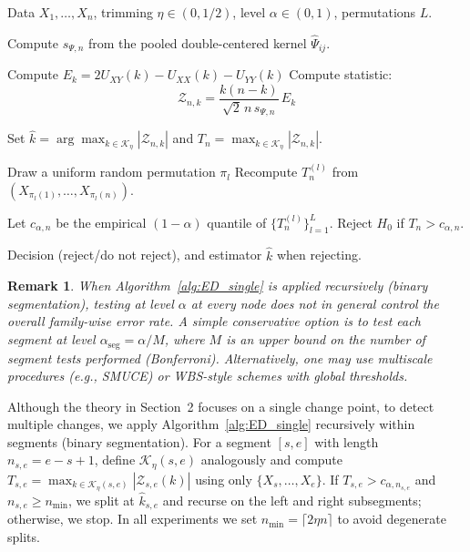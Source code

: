 \documentclass[11pt]{article}
\numberwithin{theorem}{section}
\numberwithin{Lemma}{section}
\newtheorem{remark}{Remark}
\numberwithin{Definition}{section}
\begin{document}
\begin{algorithm}[H]
\caption{ED scan statistic with permutation calibration}
\label{alg:ED_single}
\begin{algorithmic}[1]
    \Require Data $X_1,\dots,X_n$, trimming $\eta\in(0,1/2)$, level $\alpha\in(0,1)$, permutations $L$.
    
    \State Compute $s_{\Psi,n}$ from the pooled double-centered kernel $\hat{\Psi}_{ij}$.
    
        \State Compute $E_k=2U_{XY}(k)-U_{XX}(k)-U_{YY}(k)$
        \State Compute statistic:
        \[
            \mathcal{Z}_{n,k}=\frac{k(n-k)}{\sqrt{2}\,n\,s_{\Psi,n}}\,E_k
        \]
    \EndFor
    
    \State Set $\hat{k}=\arg\max_{k\in\mathcal{K}_\eta}|\mathcal{Z}_{n,k}|$ and $T_n=\max_{k\in\mathcal{K}_\eta}|\mathcal{Z}_{n,k}|$.
    
        \State Draw a uniform random permutation $\pi_l$
        \State Recompute $T_n^{(l)}$ from $(X_{\pi_l(1)},\dots,X_{\pi_l(n)})$.
    \EndFor
    
    \State Let $c_{\alpha,n}$ be the empirical $(1-\alpha)$ quantile of $\{T_n^{(l)}\}_{l=1}^L$.
    \State Reject $H_0$ if $T_n>c_{\alpha,n}$.
    
    \Ensure Decision (reject/do not reject), and estimator $\hat{k}$ when rejecting.
\end{algorithmic}
\end{algorithm}


\begin{remark}
When Algorithm~\ref{alg:ED_single} is applied recursively (binary segmentation),
testing at level $\alpha$ at every node does not in general control the overall
family-wise error rate.
A simple conservative option is to test each segment at level
$\alpha_{\mathrm{seg}}=\alpha/M$, where $M$ is an upper bound on the number of
segment tests performed (Bonferroni).
Alternatively, one may use multiscale procedures (e.g., SMUCE) or WBS-style
schemes with global thresholds.
\end{remark}



Although the theory in Section~2 focuses on a single change point, to detect multiple changes, we apply Algorithm~\ref{alg:ED_single} recursively within segments (binary segmentation).
For a segment $[s,e]$ with length $n_{s,e}=e-s+1$, define $\mathcal{K}_\eta(s,e)$ analogously and compute
$T_{s,e}=\max_{k\in\mathcal{K}_\eta(s,e)}|\mathcal{Z}_{s,e}(k)|$ using only $\{X_s,\dots,X_e\}$.
If $T_{s,e}>c_{\alpha,n_{s,e}}$ and $n_{s,e}\ge n_{\min}$, we split at $\hat{k}_{s,e}$ and recurse on the left and right
subsegments; otherwise, we stop. In all experiments we set $n_{\min}=\lceil 2\eta n\rceil$ to avoid degenerate splits.
\end{document}
